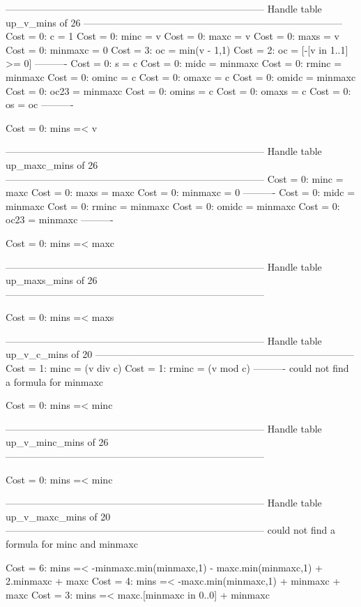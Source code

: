 --------------------------------------------------------------------------------
Handle table up_v_mins of 26
--------------------------------------------------------------------------------
Cost =  0:  c       = 1
Cost =  0:  minc    = v
Cost =  0:  maxc    = v
Cost =  0:  maxs    = v
Cost =  0:  minmaxc = 0
Cost =  3:  oc      = min(v - 1,1)
Cost =  2:  oc      = [-[v in 1..1] >= 0]
----------
Cost =  0:  s       = c
Cost =  0:  midc    = minmaxc
Cost =  0:  rminc   = minmaxc
Cost =  0:  ominc   = c
Cost =  0:  omaxc   = c
Cost =  0:  omidc   = minmaxc
Cost =  0:  oc23    = minmaxc
Cost =  0:  omins   = c
Cost =  0:  omaxs   = c
Cost =  0:  os      = oc
----------

Cost =  0:  mins =< v

--------------------------------------------------------------------------------
Handle table up_maxc_mins of 26
--------------------------------------------------------------------------------
Cost =  0:  minc    = maxc
Cost =  0:  maxs    = maxc
Cost =  0:  minmaxc = 0
----------
Cost =  0:  midc    = minmaxc
Cost =  0:  rminc   = minmaxc
Cost =  0:  omidc   = minmaxc
Cost =  0:  oc23    = minmaxc
----------

Cost =  0:  mins =< maxc

--------------------------------------------------------------------------------
Handle table up_maxs_mins of 26
--------------------------------------------------------------------------------

Cost =  0:  mins =< maxs

--------------------------------------------------------------------------------
Handle table up_v_c_mins of 20
--------------------------------------------------------------------------------
Cost =  1:  minc    = (v div c)
Cost =  1:  rminc   = (v mod c)
----------
could not find a formula for minmaxc

Cost =  0:  mins =< minc

--------------------------------------------------------------------------------
Handle table up_v_minc_mins of 26
--------------------------------------------------------------------------------

Cost =  0:  mins =< minc

--------------------------------------------------------------------------------
Handle table up_v_maxc_mins of 20
--------------------------------------------------------------------------------
could not find a formula for minc and minmaxc

Cost =  6:  mins =< -minmaxc.min(minmaxc,1) - maxc.min(minmaxc,1) + 2.minmaxc + maxc
Cost =  4:  mins =< -maxc.min(minmaxc,1) + minmaxc + maxc
Cost =  3:  mins =< maxc.[minmaxc in 0..0] + minmaxc

